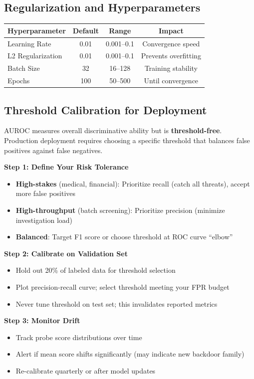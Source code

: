 \documentclass[11pt,letterpaper]{article}
\let\origsubsection\subsection
\renewcommand{\subsection}{\needspace{8\baselineskip}\origsubsection}}
\begin{document}
\subsection{Regularization and Hyperparameters}

\begin{center}
\begin{tabular}{lccc}
\toprule
\textbf{Hyperparameter} & \textbf{Default} & \textbf{Range} & \textbf{Impact} \\
\midrule
Learning Rate & 0.01 & 0.001--0.1 & Convergence speed \\
L2 Regularization & 0.01 & 0.001--0.1 & Prevents overfitting \\
Batch Size & 32 & 16--128 & Training stability \\
Epochs & 100 & 50--500 & Until convergence \\
\bottomrule
\end{tabular}
\end{center}

\subsection{Threshold Calibration for Deployment}

\begin{keyconceptbox}
AUROC measures overall discriminative ability but is \textbf{threshold-free}. Production deployment requires choosing a specific threshold that balances false positives against false negatives.

\textbf{Step 1: Define Your Risk Tolerance}
\begin{itemize}[nosep]
  \item \textbf{High-stakes} (medical, financial): Prioritize recall (catch all threats), accept more false positives
  \item \textbf{High-throughput} (batch screening): Prioritize precision (minimize investigation load)
  \item \textbf{Balanced}: Target F1 score or choose threshold at ROC curve ``elbow''
\end{itemize}

\textbf{Step 2: Calibrate on Validation Set}
\begin{itemize}[nosep]
  \item Hold out 20\% of labeled data for threshold selection
  \item Plot precision-recall curve; select threshold meeting your FPR budget
  \item Never tune threshold on test set; this invalidates reported metrics
\end{itemize}

\textbf{Step 3: Monitor Drift}
\begin{itemize}[nosep]
  \item Track probe score distributions over time
  \item Alert if mean score shifts significantly (may indicate new backdoor family)
  \item Re-calibrate quarterly or after model updates
\end{itemize}
\end{keyconceptbox}
\end{document}
